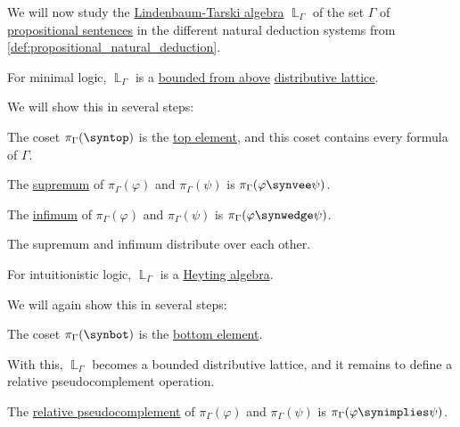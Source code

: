 \begin{proposition}\label{thm:lindenbaum_tarski_algebras}
  We will now study the \hyperref[def:lindenbaum_tarski_algebra]{Lindenbaum-Tarski algebra} \( \BbbL_\Gamma \) of the set \( \Gamma \) of \hyperref[def:propositional_formula]{propositional sentences} in the different natural deduction systems from \cref{def:propositional_natural_deduction}.

  \begin{thmenum}
     For minimal logic, \( \BbbL_\Gamma \) is a \hyperref[def:extremal_points/bounds]{bounded from above} \hyperref[def:distributive_lattice]{distributive lattice}.

    We will show this in several steps:
    \begin{thmenum}
       The coset \( \pi_\Gamma(\syntop) \) is the \hyperref[def:extremal_points/top_and_bottom]{top element}, and this coset contains every formula of \( \Gamma \).

       The \hyperref[def:extremal_points/supremum_and_infimum]{supremum} of \( \pi_\Gamma(\varphi) \) and \( \pi_\Gamma(\psi) \) is \( \pi_\Gamma(\varphi \synvee \psi) \).

       The \hyperref[def:extremal_points/supremum_and_infimum]{infimum} of \( \pi_\Gamma(\varphi) \) and \( \pi_\Gamma(\psi) \) is \( \pi_\Gamma(\varphi \synwedge \psi) \).

       The supremum and infimum distribute over each other.
    \end{thmenum}

     For intuitionistic logic, \( \BbbL_\Gamma \) is a \hyperref[def:heyting_algebra]{Heyting algebra}.

    We will again show this in several steps:
    \begin{thmenum}
       The coset \( \pi_\Gamma(\synbot) \) is the \hyperref[def:extremal_points/top_and_bottom]{bottom element}.

      With this, \( \BbbL_\Gamma \) becomes a bounded distributive lattice, and it remains to define a relative pseudocomplement operation.

       The \hyperref[def:heyting_algebra]{relative pseudocomplement} of \( \pi_\Gamma(\varphi) \) and \( \pi_\Gamma(\psi) \) is \( \pi_\Gamma(\varphi \synimplies \psi) \).


\end{thmenum}
\end{thmenum}
\end{proposition}
